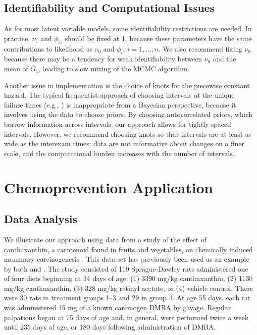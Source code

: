 \documentclass[10pt, letterpaper]{article}
\begin{document}
\subsection{Identifiability and Computational Issues}

As for most latent variable models, some identifiability restrictions are needed. In practice, $\nu_1$ and $\phi_{i1}$ should be fixed at 1, because these parameters have the same contributions to likelihood as $\nu_0$ and $\phi_i$, $i=1, \dots, n$. We also recommend fixing $\nu_0$ because there may be a tendency for weak identifiability between $\nu_0$ and the mean of $G_1$, leading to slow mixing of the MCMC algorithm.

Another issue in implementation is the choice of knots for the piecewise constant hazard. The typical frequentist approach of choosing intervals at the unique failure times (e.g., \citealp{Breslow1974}) is inappropriate from a Bayesian perspective, because it involves using the data to choose priors. By choosing autocorrelated priors, which borrow information across intervals, our approach allows for tightly spaced intervals. However, we recommend choosing knots so that intervals are at least as wide as the interexam times; data are not informative about changes on a finer scale, and the computational burden increases with the number of intervals.

\section{Chemoprevention Application}

\subsection{Data Analysis}

We illustrate our approach using data from a study of the effect of canthaxanthin, a carotenoid found in fruits and vegetables, on chemically induced mammary carcinogenesis \citep{Grubbs1991}. This data set has previously been used as an example by both \citet{Kokoska1993} and \citet{Dunson2000b}. The study consisted of 119 Sprague-Dawley rats administered one of four diets beginning at 34 days of age: (1) 3390 mg/kg canthaxanthin, (2) 1130 mg/kg canthaxanthin, (3) 328 mg/kg retinyl acetate, or (4) vehicle control. There were 30 rats in treatment groups 1--3 and 29 in group 4. At age 55 days, each rat was administered 15 mg of a known carcinogen DMBA by gavage. Regular palpations began at 75 days of age and, in general, were performed twice a week until 235 days of age, or 180 days following administration of DMBA.
\end{document}
